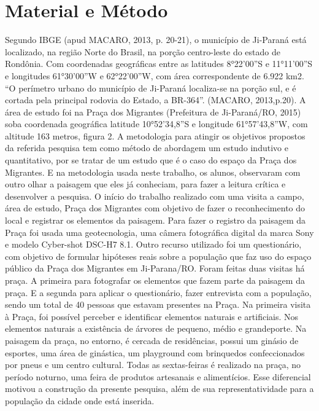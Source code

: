 \documentclass[article,12pt,onesidea,4paper,english,brazil]{abntex2}
\begin{document}
	
	\section*{Material e Método}
	
	Segundo IBGE (apud MACARO, 2013, p. 20-21), o município de Ji-Paraná está localizado, na região Norte do Brasil, na porção centro-leste do estado de Rondônia. Com coordenadas geográficas entre as latitudes 8°22’00”S e 11°11’00”S e longitudes 61°30’00”W e 62°22’00”W, com área correspondente de 6.922 km2. “O perímetro urbano do município de Ji-Paraná localiza-se na porção sul, e é cortada pela principal rodovia do Estado, a BR-364”. (MACARO, 2013,p.20).
	A área de estudo foi na Praça dos Migrantes (Prefeitura de Ji-Paraná/RO, 2015) soba coordenada geográfica latitude 10°52’34,8”S e longitude 61°57’43,8”W, com altitude 163 metros, figura 2.
	A metodologia para atingir os objetivos propostos da referida pesquisa tem como método de abordagem um estudo indutivo e quantitativo, por se tratar de um estudo que é o caso do espaço da Praça dos Migrantes.
	E na metodologia usada neste trabalho, os alunos, observaram com outro olhar a paisagem que eles já conheciam, para fazer a leitura crítica e desenvolver a pesquisa.
	O início do trabalho realizado com uma visita a campo, área de estudo, Praça dos Migrantes com objetivo de fazer o reconhecimento do local e registrar os elementos da paisagem. Para fazer o registro da paisagem da Praça foi usada uma geotecnologia, uma câmera fotográfica digital da marca Sony e modelo Cyber-shot DSC-H7 8.1.
	Outro recurso utilizado foi um questionário, com objetivo de formular hipóteses reais sobre a população que faz uso do espaço público da Praça dos Migrantes em Ji-Parana/RO.
	Foram feitas duas visitas há praça. A primeira para fotografar os elementos que fazem parte da paisagem da praça. E a segunda para aplicar o questionário, fazer entrevista com a população, sendo um total de 40 pessoas que estavam presentes na Praça.
	Na primeira visita à Praça, foi possível perceber e identificar elementos naturais e artificiais. Nos elementos naturais a existência de árvores de pequeno, médio e grandeporte.
	Na paisagem da praça, no entorno, é cercada de residências, possui um ginásio de esportes, uma área de ginástica, um playground com brinquedos confeccionados por pneus e um centro cultural. Todas as sextas-feiras é realizado na praça, no período noturno, uma feira de produtos artesanais e alimentícios. Esse diferencial motivou a construção da presente pesquisa, além de sua representatividade para a população da cidade onde está inserida.
	
\end{document}
